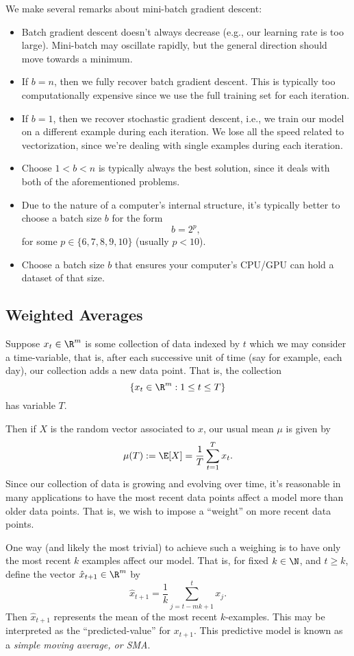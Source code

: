 We make several remarks about mini-batch gradient descent:
\begin{itemize}
	\item Batch gradient descent doesn't always decrease (e.g., our learning rate is too large).  Mini-batch may oscillate rapidly, but the general direction should move towards a minimum.
	\item If $b=n$, then we fully recover batch gradient descent.  This is typically too computationally expensive since we use the full training set for each iteration.
	\item If $b=1$, then we recover stochastic gradient descent, i.e., we train our model on a different example during each iteration.  We lose all the speed related to vectorization, since we're dealing with single examples during each iteration.
	\item Choose $1<b<n$ is typically always the best solution, since it deals with both of the aforementioned problems.
	\item Due to the nature of a computer's internal structure, it's typically better to choose a batch size $b$ for the form
		$$b=2^p,$$
		for some $p\in\{6,7,8,9,10\}$ (usually $p<10$).
	\item Choose a batch size $b$ that ensures your computer's CPU/GPU can hold a dataset of that size.
\end{itemize}


\subsection{Weighted Averages}

Suppose $x_t\in\R^m$ is some collection of data indexed by $t$ which we may consider a time-variable, that is, after each successive unit of time (say for example, each day), our collection adds a new data point.  That is, the collection
$$\{x_t\in\R^m:1\leq t\leq T\}$$
has variable $T$.  

Then if $X$ is the random vector associated to $x$, our usual mean $\mu$ is given by
$$\mu(T):=\E[X]=\frac{1}{T}\sum_{t=1}^Tx_t.$$
Since our collection of data is growing and evolving over time, it's reasonable in many applications to have the most recent data points affect a model more than older data points.  That is, we wish to impose a ``weight'' on more recent data points.

One way (and likely the most trivial) to achieve such a weighing is to have only the most recent $k$ examples affect our model.  That is, for fixed $k\in\N$, and $t\geq k$, define the vector $\hat{x}_{t+1}\in\R^m$ by
$$\hat{x}_{t+1}=\frac{1}{k}\sum_{j=t-mk+1}^tx_j.$$
Then $\hat{x}_{t+1}$ represents the mean of the most recent $k$-examples.  This may be interpreted as the ``predicted-value'' for $x_{t+1}$.  This predictive model is known as a \textit{simple moving average, or SMA}.

